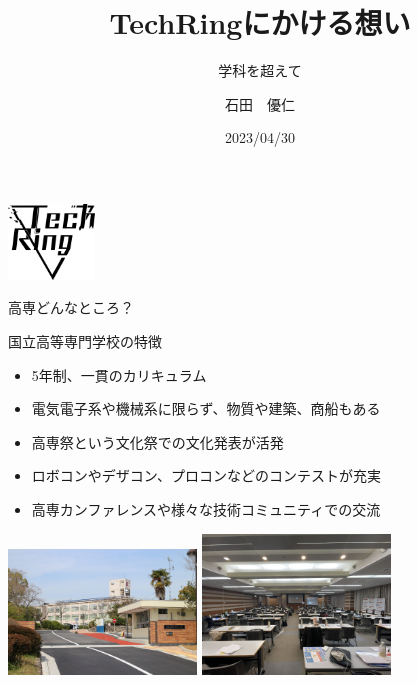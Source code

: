 \documentclass[dvipdfmx]{beamer}
\title{TechRingにかける想い}
\subtitle{学科を超えて}
\author[Jin]{石田　優仁}
\institute[TechRing]{奈良高専TechRing}
\date[2023/04/30]{2023/04/30}
\begin{document}
\begin{frame}
  \begin{flushright}
      \includegraphics[width=2.3cm]{pic/Logo.png}
  \end{flushright}
  \titlepage
\end{frame}

\begin{frame}{高専どんなところ？}

  \begin{block}{国立高等専門学校の特徴}
    \begin{itemize}
      \setlength{\itemsep}{1mm}
      \item 5年制、一貫のカリキュラム
      \item 電気電子系や機械系に限らず、物質や建築、商船もある
      \item \alert{高専祭}という文化祭での文化発表が活発
      \item \alert{ロボコン}やデザコン、プロコンなどのコンテストが充実
      \item \alert{高専カンファレンス}や様々な技術コミュニティでの交流
    \end{itemize}
  \end{block}

  \begin{center}
    \includegraphics[width=5cm]{pic/nitnc.jpg}
    \includegraphics[width=5cm]{pic/Conf.jpg}
  \end{center}

\end{frame}
\end{document}
